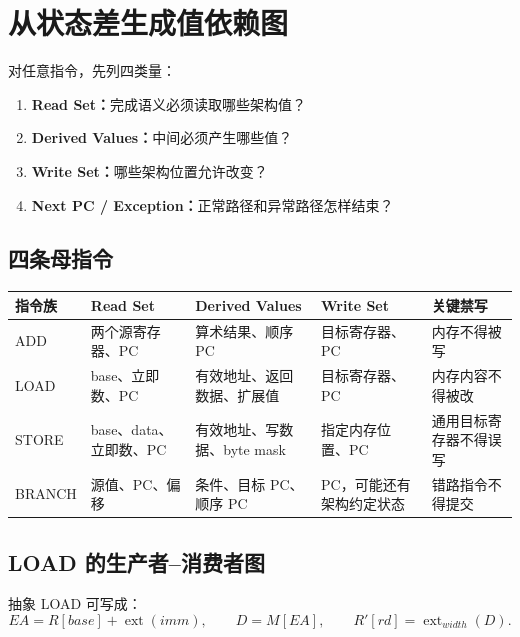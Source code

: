 \documentclass[UTF8,fontset=fandol,11pt,a4paper]{ctexart}
\newcommand{\kw}[1]{\textbf{\color{deep}#1}}
\begin{document}
\section{从状态差生成值依赖图}

对任意指令，先列四类量：
\begin{enumerate}
  \item \kw{Read Set：}完成语义必须读取哪些架构值？
  \item \kw{Derived Values：}中间必须产生哪些值？
  \item \kw{Write Set：}哪些架构位置允许改变？
  \item \kw{Next PC / Exception：}正常路径和异常路径怎样结束？
\end{enumerate}

\subsection{四条母指令}

\begin{center}
\small
\begin{tabularx}{\linewidth}{L{2.1cm}YYYY}
\toprule
指令族 & Read Set & Derived Values & Write Set & 关键禁写 \\
\midrule
ADD & 两个源寄存器、PC & 算术结果、顺序 PC & 目标寄存器、PC & 内存不得被写 \\
LOAD & base、立即数、PC & 有效地址、返回数据、扩展值 & 目标寄存器、PC & 内存内容不得被改 \\
STORE & base、data、立即数、PC & 有效地址、写数据、byte mask & 指定内存位置、PC & 通用目标寄存器不得误写 \\
BRANCH & 源值、PC、偏移 & 条件、目标 PC、顺序 PC & PC，可能还有架构约定状态 & 错路指令不得提交 \\
\bottomrule
\end{tabularx}
\end{center}

\subsection{LOAD 的生产者--消费者图}

抽象 LOAD 可写成：
\[
EA=R[base]+\operatorname{ext}(imm),
\qquad
D=M[EA],
\qquad
R'[rd]=\operatorname{ext}_{width}(D).
\]
\end{document}
